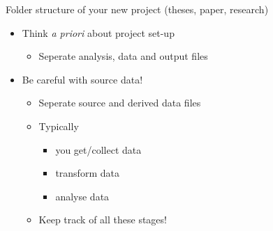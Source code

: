 \documentclass[ignorenonframetext,]{beamer}
\begin{document}
\begin{frame}{Folder structure of your new project (theses, paper,
research)}

\begin{itemize}
\item
  Think \emph{a priori} about project set-up

  \begin{itemize}
  \itemsep1pt\parskip0pt
  \item
    Seperate analysis, data and output files
  \end{itemize}
\item
  Be careful with source data!

  \begin{itemize}
  \item
    Seperate source and derived data files
  \item
    Typically

    \begin{itemize}
    \itemsep1pt\parskip0pt
    \item
      you get/collect data
    \item
      transform data
    \item
      analyse data
    \end{itemize}
  \item
    Keep track of all these stages!
  \end{itemize}
\end{itemize}

\end{frame}
\end{document}
